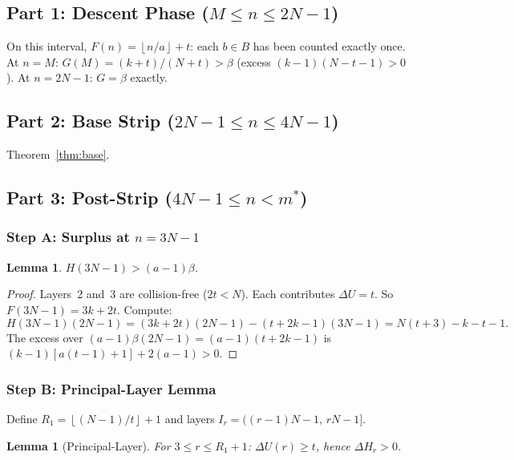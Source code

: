 \documentclass[11pt,a4paper]{article}
\newtheorem{lemma}[theorem]{Lemma}
\theoremstyle{definition}
\newcommand{\floor}[1]{\left\lfloor #1 \right\rfloor}
\begin{document}
\subsection{Part 1: Descent Phase ($M \leq n \leq 2N-1$)}

On this interval, $F(n) = \floor{n/a} + t$: each $b \in B$ has been counted
exactly once. At $n = M$: $G(M) = (k+t)/(N+t) > \beta$ (excess
$(k-1)(N-t-1) > 0$). At $n = 2N-1$: $G = \beta$ exactly.

\subsection{Part 2: Base Strip ($2N-1 \leq n \leq 4N-1$)}

Theorem~\ref{thm:base}.

\subsection{Part 3: Post-Strip ($4N-1 \leq n < m^*$)}

\subsubsection{Step A: Surplus at $n = 3N-1$}

\begin{lemma}\label{lem:surplus}
$H(3N-1) > (a-1)\beta$.
\end{lemma}

\begin{proof}
Layers~2 and~3 are collision-free ($2t < N$). Each contributes $\Delta U = t$.
So $F(3N-1) = 3k + 2t$. Compute:
\[
H(3N-1)(2N-1) = (3k+2t)(2N-1) - (t+2k-1)(3N-1) = N(t+3) - k - t - 1.
\]
The excess over $(a-1)\beta(2N-1) = (a-1)(t+2k-1)$ is
$(k-1)[a(t-1)+1] + 2(a-1) > 0$.
\end{proof}

\subsubsection{Step B: Principal-Layer Lemma}

Define $R_1 = \floor{(N-1)/t} + 1$ and layers
$I_r = ((r-1)N-1,\, rN-1]$.

\begin{lemma}[Principal-Layer]\label{lem:principal}
For $3 \leq r \leq R_1 + 1$: $\Delta U(r) \geq t$, hence $\Delta H_r > 0$.
\end{lemma}
\end{document}
